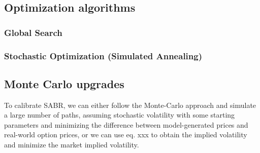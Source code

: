 \subsection{Optimization algorithms}
\subsubsection{Global Search}

\subsubsection{Stochastic Optimization (Simulated Annealing)}

\subsection{Monte Carlo upgrades}

To calibrate SABR, we can either follow the Monte-Carlo approach and simulate a large number of paths, assuming stochastic volatility with some starting parameters and minimizing the difference between model-generated prices and real-world option prices, or we can use eq. xxx to obtain the implied volatility and minimize the market implied volatility.
